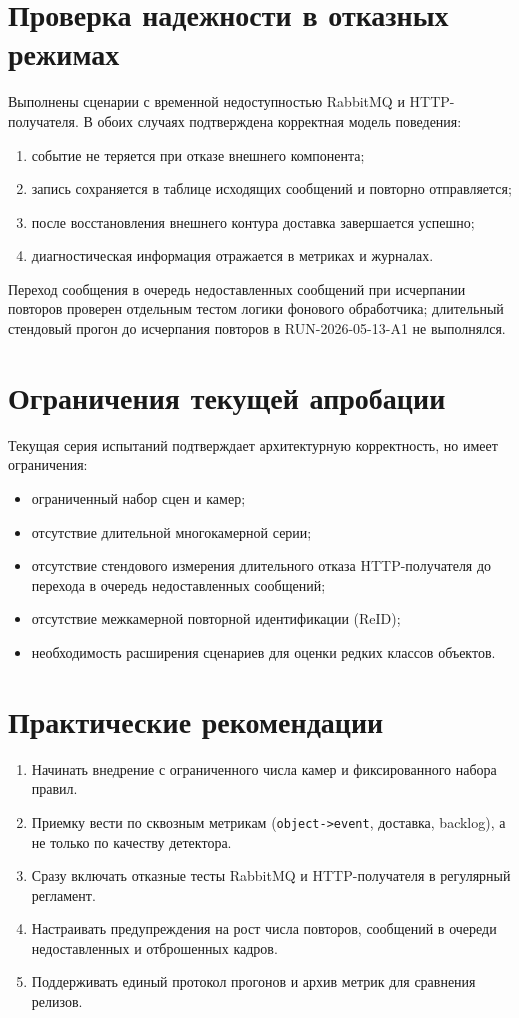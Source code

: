 \section{Проверка надежности в отказных режимах}

Выполнены сценарии с временной недоступностью RabbitMQ и HTTP-получателя. В обоих случаях подтверждена корректная модель поведения:
\begin{enumerate}
    \item событие не теряется при отказе внешнего компонента;
    \item запись сохраняется в таблице исходящих сообщений и повторно отправляется;
    \item после восстановления внешнего контура доставка завершается успешно;
    \item диагностическая информация отражается в метриках и журналах.
\end{enumerate}

Переход сообщения в очередь недоставленных сообщений при исчерпании повторов проверен отдельным тестом логики фонового обработчика; длительный стендовый прогон до исчерпания повторов в RUN-2026-05-13-A1 не выполнялся.

\section{Ограничения текущей апробации}

Текущая серия испытаний подтверждает архитектурную корректность, но имеет ограничения:
\begin{itemize}
    \item ограниченный набор сцен и камер;
    \item отсутствие длительной многокамерной серии;
    \item отсутствие стендового измерения длительного отказа HTTP-получателя до перехода в очередь недоставленных сообщений;
    \item отсутствие межкамерной повторной идентификации (ReID);
    \item необходимость расширения сценариев для оценки редких классов объектов.
\end{itemize}

\section{Практические рекомендации}

\begin{enumerate}
    \item Начинать внедрение с ограниченного числа камер и фиксированного набора правил.
    \item Приемку вести по сквозным метрикам (\texttt{object->event}, доставка, backlog), а не только по качеству детектора.
    \item Сразу включать отказные тесты RabbitMQ и HTTP-получателя в регулярный регламент.
    \item Настраивать предупреждения на рост числа повторов, сообщений в очереди недоставленных и отброшенных кадров.
    \item Поддерживать единый протокол прогонов и архив метрик для сравнения релизов.
\end{enumerate}

